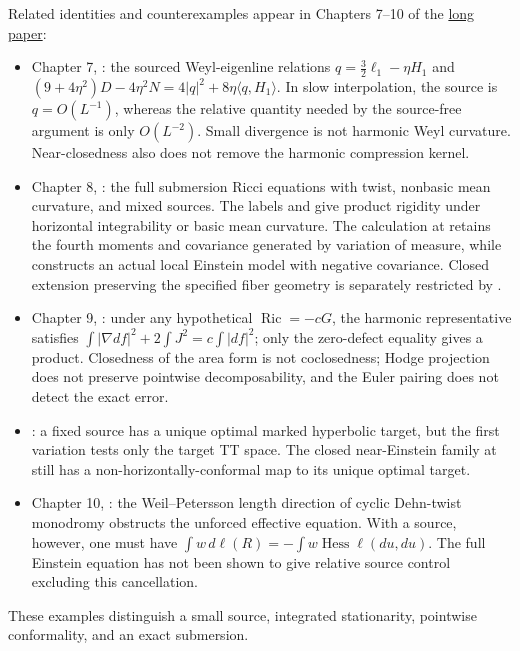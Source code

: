 \documentclass[a4paper,11pt]{article}
\numberwithin{equation}{section}
\theoremstyle{definition}
\newcommand{\Ric}{\operatorname{Ric}}
\begin{document}
Related identities and counterexamples appear in Chapters 7--10 of the \href{20260912.tex}{long paper}:
\begin{itemize}
\item Chapter 7, : the sourced Weyl-eigenline relations
$q=\tfrac32\ell_1-\eta H_1$ and
$(9+4\eta^2)D-4\eta^2N=4|q|^2+8\eta\langle q,H_1\rangle$.
In slow interpolation, the source is $q=O(L^{-1})$, whereas the relative quantity needed by the source-free argument is only $O(L^{-2})$.
Small divergence is not harmonic Weyl curvature. Near-closedness also does not remove the harmonic compression kernel.
\item Chapter 8, : the full submersion Ricci equations with twist, nonbasic mean curvature, and mixed sources.
The labels  and  give product rigidity under horizontal integrability or basic mean curvature.
The calculation at  retains the fourth moments and covariance generated by variation of measure, while  constructs an actual local Einstein model with negative covariance.
Closed extension preserving the specified fiber geometry is separately restricted by .
\item Chapter 9, : under any hypothetical $\Ric=-cG$, the harmonic representative satisfies
$\int|\nabla df|^2+2\int J^2=c\int|df|^2$; only the zero-defect equality gives a product.
Closedness of the area form is not coclosedness; Hodge projection does not preserve pointwise decomposability, and the Euler pairing does not detect the exact error.
\item {}: a fixed source has a unique optimal marked hyperbolic target, but the first variation tests only the target TT space.
The closed near-Einstein family at  still has a non-horizontally-conformal map to its unique optimal target.
\item Chapter 10, : the Weil--Petersson length direction of cyclic Dehn-twist monodromy obstructs the unforced effective equation.
With a source, however, one must have $\int w\,d\ell(R)=-\int w\operatorname{Hess}\ell(du,du)$.
The full Einstein equation has not been shown to give relative source control excluding this cancellation.
\end{itemize}
These examples distinguish a small source, integrated stationarity, pointwise conformality, and an exact submersion.
\end{document}
